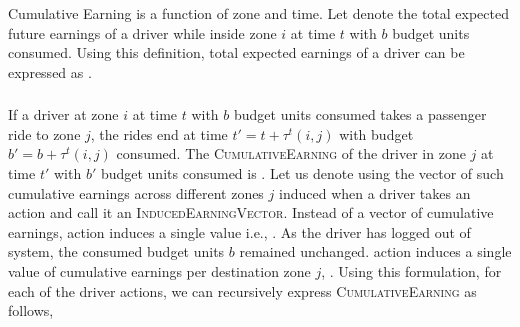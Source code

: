 \subsubsection{}

Cumulative Earning is a function of zone and time. Let {} denote the total expected future earnings of a driver
while inside zone $i$ at time $t$ with $b$ budget units consumed. Using this definition, total expected earnings of a driver can be expressed
as {}.

\subsubsection{}

If a driver at zone $i$ at time $t$ with $b$ budget units consumed takes a passenger ride to zone $j$, the rides end at time 
$t' = t + \tau^t(i,j)$ with budget $b' = b + \tau^t(i,j)$ consumed. The \textsc{CumulativeEarning} of the driver in zone $j$ at time $t'$ with $b'$
budget units consumed is {}. Let us denote using {} the vector of such
cumulative earnings across different zones $j$ induced when a driver takes an action {\getpassengeraction} and call it an 
\textsc{InducedEarningVector}. Instead of a vector of cumulative earnings, {\gohome} action induces a single value i.e., {}. 
As the driver has logged out of system, the consumed budget units $b$ remained unchanged. {\relocate} action induces a single value of cumulative earnings per destination zone $j$, {}. 
Using this formulation, for each of the driver actions, we can recursively express \textsc{CumulativeEarning} as follows,
